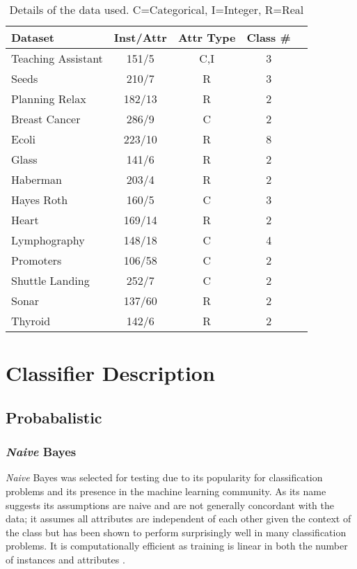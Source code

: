 \documentclass{cmppgr}
\begin{document}
\begin{table}[h]
	\centering
	\caption{Details of the data used. C=Categorical, I=Integer, R=Real}
	\begin{tabular}{|l|c|c|c|c|}
		\hline
		Dataset & Inst/Attr& Attr Type &Class \# \\\hline\hline
		Teaching Assistant & 151/5& C,I & 3 \\
		Seeds & 210/7& R & 3 \\
		Planning Relax & 182/13&R & 2 \\
		Breast Cancer & 286/9& C & 2 \\
		Ecoli & 223/10 & R & 8 \\
		Glass & 141/6  & R& 2 \\
		Haberman & 203/4 &R & 2 \\
		Hayes Roth & 160/5 & C & 3 \\
		Heart & 169/14& R& 2 \\
		Lymphography & 148/18 & C& 4 \\
		Promoters & 106/58  &C & 2 \\
		Shuttle Landing & 252/7 &C& 2 \\
		Sonar & 137/60&R & 2  \\
		Thyroid & 142/6& R & 2 \\\hline
	\end{tabular}
	\label{tab:example}
\end{table}




\section{Classifier Description}
\subsection{Probabalistic}
\subsubsection{\textit{Naive} Bayes}
\textit{Naive} Bayes was selected for testing due to its popularity for classification problems and its presence in the machine learning community. As its name suggests its assumptions are naive and are not generally concordant with the data; it assumes all attributes are independent of each other given the context of the class but has been shown to perform surprisingly well in many classification problems. It is computationally efficient as training is linear in both the number of instances and attributes \cite{frank2002locally}. 
\end{document}
